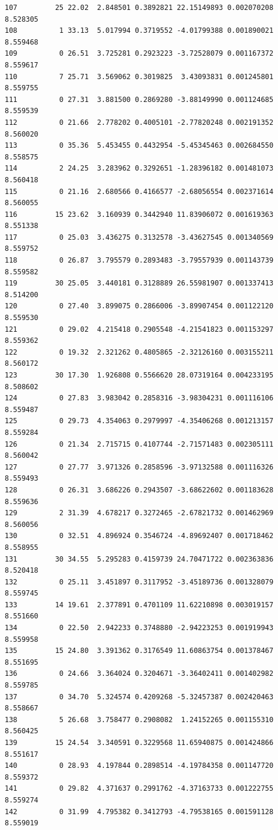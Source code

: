 \documentclass[]{book}
\theoremstyle{definition}
\theoremstyle{definition}
\theoremstyle{definition}
\theoremstyle{remark}
\begin{document}
\begin{verbatim}
107         25 22.02  2.848501 0.3892821 22.15149893 0.002070208 8.528305
108          1 33.13  5.017994 0.3719552 -4.01799388 0.001890021 8.559468
109          0 26.51  3.725281 0.2923223 -3.72528079 0.001167372 8.559617
110          7 25.71  3.569062 0.3019825  3.43093831 0.001245801 8.559755
111          0 27.31  3.881500 0.2869280 -3.88149990 0.001124685 8.559539
112          0 21.66  2.778202 0.4005101 -2.77820248 0.002191352 8.560020
113          0 35.36  5.453455 0.4432954 -5.45345463 0.002684550 8.558575
114          2 24.25  3.283962 0.3292651 -1.28396182 0.001481073 8.560418
115          0 21.16  2.680566 0.4166577 -2.68056554 0.002371614 8.560055
116         15 23.62  3.160939 0.3442940 11.83906072 0.001619363 8.551338
117          0 25.03  3.436275 0.3132578 -3.43627545 0.001340569 8.559752
118          0 26.87  3.795579 0.2893483 -3.79557939 0.001143739 8.559582
119         30 25.05  3.440181 0.3128889 26.55981907 0.001337413 8.514200
120          0 27.40  3.899075 0.2866006 -3.89907454 0.001122120 8.559530
121          0 29.02  4.215418 0.2905548 -4.21541823 0.001153297 8.559362
122          0 19.32  2.321262 0.4805865 -2.32126160 0.003155211 8.560172
123         30 17.30  1.926808 0.5566620 28.07319164 0.004233195 8.508602
124          0 27.83  3.983042 0.2858316 -3.98304231 0.001116106 8.559487
125          0 29.73  4.354063 0.2979997 -4.35406268 0.001213157 8.559284
126          0 21.34  2.715715 0.4107744 -2.71571483 0.002305111 8.560042
127          0 27.77  3.971326 0.2858596 -3.97132588 0.001116326 8.559493
128          0 26.31  3.686226 0.2943507 -3.68622602 0.001183628 8.559636
129          2 31.39  4.678217 0.3272465 -2.67821732 0.001462969 8.560056
130          0 32.51  4.896924 0.3546724 -4.89692407 0.001718462 8.558955
131         30 34.55  5.295283 0.4159739 24.70471722 0.002363836 8.520418
132          0 25.11  3.451897 0.3117952 -3.45189736 0.001328079 8.559745
133         14 19.61  2.377891 0.4701109 11.62210898 0.003019157 8.551660
134          0 22.50  2.942233 0.3748880 -2.94223253 0.001919943 8.559958
135         15 24.80  3.391362 0.3176549 11.60863754 0.001378467 8.551695
136          0 24.66  3.364024 0.3204671 -3.36402411 0.001402982 8.559785
137          0 34.70  5.324574 0.4209268 -5.32457387 0.002420463 8.558667
138          5 26.68  3.758477 0.2908082  1.24152265 0.001155310 8.560425
139         15 24.54  3.340591 0.3229568 11.65940875 0.001424866 8.551617
140          0 28.93  4.197844 0.2898514 -4.19784358 0.001147720 8.559372
141          0 29.82  4.371637 0.2991762 -4.37163733 0.001222755 8.559274
142          0 31.99  4.795382 0.3412793 -4.79538165 0.001591128 8.559019

\end{verbatim}
\end{document}
